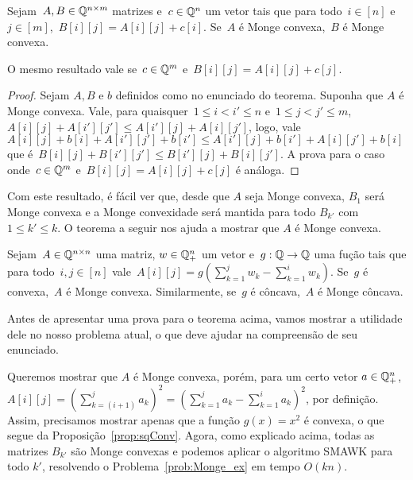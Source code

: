 \begin{lema}
Sejam~$A,B \in \mathbb{Q}^{n \times m}$ matrizes e~$c \in \mathbb{Q}^n$ um vetor tais que para todo~$i \in [n]$ e~$j \in [m]$,~${B[i][j] = A[i][j] + c[i]}$. Se~$A$ é Monge convexa,~$B$ é Monge convexa.  

O mesmo resultado vale se~$c \in \mathbb{Q}^m$ e~${B[i][j] = A[i][j] + c[j]}$.
\end{lema}

\begin{proof}
Sejam $A,B$ e $b$ definidos como no enunciado do teorema. Suponha que $A$ é Monge convexa. Vale, para quaisquer~${1 \leq i < i' \leq n}$ e~${1 \leq j < j' \leq m}$,~${A[i][j] + A[i'][j'] \leq A[i'][j] + A[i][j']}$, logo, vale~${A[i][j] + b[i] + A[i'][j'] + b[i'] \leq A[i'][j] + b[i'] + A[i][j'] + b[i]}$ que é~${B[i][j] + B[i'][j'] \leq B[i'][j] + B[i][j']}$. A prova para o caso onde~$c \in \mathbb{Q}^m$ e~${B[i][j] = A[i][j] + c[j]}$ é análoga.
\end{proof}

Com este resultado, é fácil ver que, desde que $A$ seja Monge convexa, $B_1$ será Monge convexa e a Monge convexidade será mantida para todo $B_{k'}$ com $1 \leq k' \leq k$. O teorema a seguir nos ajuda a mostrar que $A$ é Monge convexa.

\begin{theo} \label{theo:MongeConvex_and_Convex}
Sejam~$A \in \mathbb{Q}^{n \times n}$ uma matriz, $w \in \mathbb{Q}_+^n$ um vetor e~${g : \mathbb{Q} \to \mathbb{Q}}$ uma fução tais que para todo~$i,j \in [n]$ vale~${A[i][j] = g\left(\sum\limits_{k=1}^j w_k - \sum\limits_{k=1}^i w_k\right)}$. Se~$g$ é convexa,~$A$ é Monge convexa. Similarmente, se~$g$ é côncava,~$A$ é Monge côncava.
\end{theo}

Antes de apresentar uma prova para o teorema acima, vamos mostrar a utilidade dele no nosso problema atual, o que deve ajudar na compreensão de seu enunciado.  

Queremos mostrar que $A$ é Monge convexa, porém, para um certo vetor $a \in \mathbb{Q}_+^n$, $A[i][j] = \left(\sum\limits_{k=(i+1)}^{j} a_k \right)^2 = \left(\sum\limits_{k=1}^{j} a_k - \sum\limits_{k=1}^{i} a_k \right)^2$, por definição. Assim, precisamos mostrar apenas que a função $g(x) = x^2$ é convexa, o que segue da Proposição~\ref{prop:sqConv}. Agora, como explicado acima, todas as matrizes $B_{k'}$ são Monge convexas e podemos aplicar o algoritmo SMAWK para todo $k'$, resolvendo o Problema~\ref{prob:Monge_ex} em tempo $O(kn)$.

